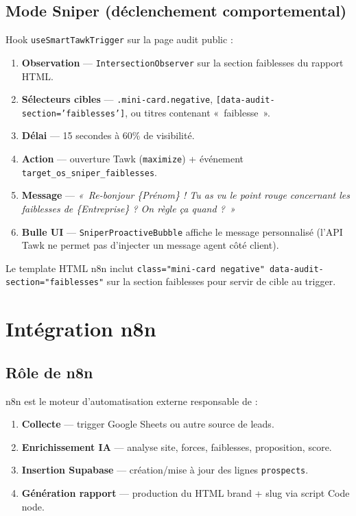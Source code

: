 \documentclass[11pt,a4paper]{report}
\begin{document}
\section{Mode Sniper (déclenchement comportemental)}

Hook \texttt{useSmartTawkTrigger} sur la page audit public :

\begin{enumerate}[leftmargin=*]
  \item \textbf{Observation} --- \texttt{IntersectionObserver} sur la section faiblesses du rapport HTML.
  \item \textbf{Sélecteurs cibles} --- \texttt{.mini-card.negative}, \texttt{[data-audit-section='faiblesses']}, ou titres contenant «~faiblesse~».
  \item \textbf{Délai} --- 15 secondes à 60\% de visibilité.
  \item \textbf{Action} --- ouverture Tawk (\texttt{maximize}) + événement \texttt{target\_os\_sniper\_faiblesses}.
  \item \textbf{Message} --- \emph{«~Re-bonjour \{Prénom\} ! Tu as vu le point rouge concernant les faiblesses de \{Entreprise\} ? On règle ça quand ?~»}
  \item \textbf{Bulle UI} --- \texttt{SniperProactiveBubble} affiche le message personnalisé (l'API Tawk ne permet pas d'injecter un message agent côté client).
\end{enumerate}

Le template HTML n8n inclut \texttt{class="mini-card negative" data-audit-section="faiblesses"} sur la section faiblesses pour servir de cible au trigger.

\chapter{Intégration n8n}

\section{Rôle de n8n}

n8n est le moteur d'automatisation externe responsable de :

\begin{enumerate}[leftmargin=*]
  \item \textbf{Collecte} --- trigger Google Sheets ou autre source de leads.
  \item \textbf{Enrichissement IA} --- analyse site, forces, faiblesses, proposition, score.
  \item \textbf{Insertion Supabase} --- création/mise à jour des lignes \texttt{prospects}.
  \item \textbf{Génération rapport} --- production du HTML brand + slug via script Code node.
\end{enumerate}
\end{document}

